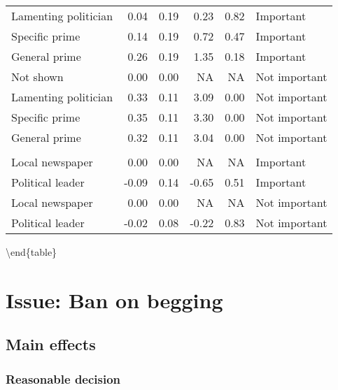 \documentclass[
]{book}
\begin{document}
\begin{tabular}[t]{lrrrrl}
\hspace{1em}Lamenting politician & 0.04 & 0.19 & 0.23 & 0.82 & Important\\
\hspace{1em}Specific prime & 0.14 & 0.19 & 0.72 & 0.47 & Important\\
\hspace{1em}General prime & 0.26 & 0.19 & 1.35 & 0.18 & Important\\
\hspace{1em}Not shown & 0.00 & 0.00 & NA & NA & Not important\\
\hspace{1em}Lamenting politician & 0.33 & 0.11 & 3.09 & 0.00 & Not important\\
\hspace{1em}Specific prime & 0.35 & 0.11 & 3.30 & 0.00 & Not important\\
\hspace{1em}General prime & 0.32 & 0.11 & 3.04 & 0.00 & Not important\\
\addlinespace[0.3em]
\multicolumn{6}{l}{\textbf{Messenger}}\\
\hspace{1em}Local newspaper & 0.00 & 0.00 & NA & NA & Important\\
\hspace{1em}Political leader & -0.09 & 0.14 & -0.65 & 0.51 & Important\\
\hspace{1em}Local newspaper & 0.00 & 0.00 & NA & NA & Not important\\
\hspace{1em}Political leader & -0.02 & 0.08 & -0.22 & 0.83 & Not important\\
\bottomrule
\end{tabular}

\textbackslash end\{table\}

\hypertarget{issue-ban-on-begging}{%
\chapter{Issue: Ban on begging}\label{issue-ban-on-begging}}

\hypertarget{main-effects-3}{%
\section{Main effects}\label{main-effects-3}}

\hypertarget{reasonable-decision-1}{%
\subsection{Reasonable decision}\label{reasonable-decision-1}}
\end{document}
